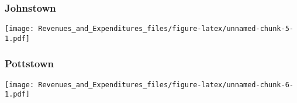 \documentclass[]{article}
\begin{document}
\hypertarget{johnstown}{%
\subsubsection{Johnstown}\label{johnstown}}

\texttt{[image: Revenues\_and\_Expenditures\_files/figure-latex/unnamed-chunk-5-1.pdf]}

\hypertarget{pottstown}{%
\subsubsection{Pottstown}\label{pottstown}}

\texttt{[image: Revenues\_and\_Expenditures\_files/figure-latex/unnamed-chunk-6-1.pdf]}
\end{document}
